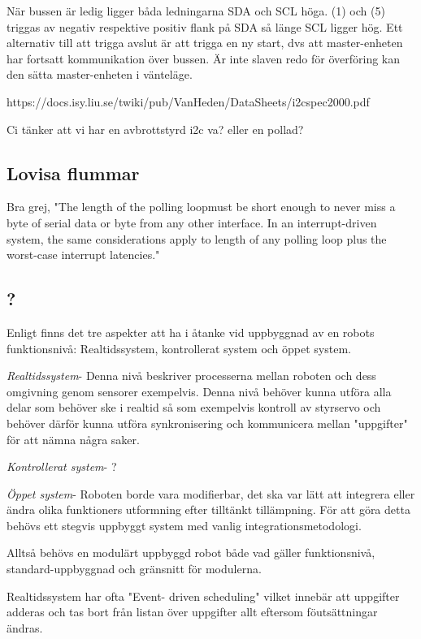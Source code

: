 \documentclass[11pt]{article}
\begin{document}
\begin{flushleft}
När bussen är ledig ligger båda ledningarna SDA och SCL höga. (1) och (5) triggas av negativ respektive positiv flank på SDA så länge SCL ligger hög. Ett alternativ till att trigga avslut är att trigga en ny start, dvs att master-enheten har fortsatt kommunikation över bussen. Är inte slaven redo för överföring kan den sätta master-enheten i vänteläge.

https://docs.isy.liu.se/twiki/pub/VanHeden/DataSheets/i2cspec2000.pdf

Ci tänker att vi har en avbrottstyrd i2c va? eller en pollad?


\subsection{Lovisa flummar}


Bra grej, "The length of the polling loopmust be short enough to never miss a byte of serial data or byte from any other interface. In an interrupt-driven system, the same considerations apply to length of any polling loop plus the worst-case interrupt latencies."

\subsection{?}
Enligt \cite{GenoM} finns det tre aspekter att ha i åtanke vid uppbyggnad av en robots funktionsnivå: Realtidssystem, kontrollerat system och öppet system. 

\textit{Realtidssystem}- Denna nivå beskriver processerna mellan roboten och dess omgivning genom sensorer exempelvis. Denna nivå behöver kunna utföra alla delar som behöver ske i realtid så som exempelvis kontroll av styrservo och behöver därför kunna utföra synkronisering och kommunicera mellan "uppgifter" för att nämna några saker. 

\textit{Kontrollerat system}- ?

\textit{Öppet system}- Roboten borde vara modifierbar, det ska var lätt att integrera eller ändra olika funktioners utformning efter tilltänkt tillämpning. För att göra detta behövs ett stegvis uppbyggt system med vanlig integrationsmetodologi. 

Alltså behövs en modulärt uppbyggd robot både vad gäller funktionsnivå, standard-uppbyggnad och gränsnitt för modulerna. 

Realtidssystem har ofta "Event- driven  scheduling" vilket innebär att uppgifter adderas och tas bort från listan över uppgifter allt eftersom föutsättningar ändras. 


\end{flushleft}
\end{document}
